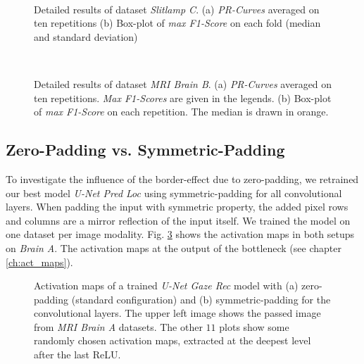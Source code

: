 \begin{figure}[!htbp]
  \centering
  \\[30pt]
  \caption[Detailed results of dataset \textit{Slitlamp C}]{Detailed results of dataset \textit{Slitlamp C}. (a) \textit{PR-Curves} averaged on ten repetitions (b) Box-plot of \textit{max F1-Score} on each fold (median and standard deviation)}
  \label{fig:curves_ds14}  
\end{figure}

\clearpage
\begin{figure}[!htbp]
  \centering
  \\[20pt]
  \caption[Detailed results of dataset \textit{Slit-Lamp Retina C}]{Detailed results of dataset \textit{MRI Brain B}. (a) \textit{PR-Curves} averaged on ten repetitions. \textit{Max F1-Scores} are given in the legends. (b) Box-plot of \textit{max F1-Score} on each repetition. The median is drawn in orange.}
  \label{fig:curves_ds16}  
\end{figure}

\subsection{Zero-Padding vs. Symmetric-Padding} \label{ch:zero_vs_sym_pad}
To investigate the influence of the border-effect due to zero-padding, we retrained our best model \textit{U-Net Pred Loc} using symmetric-padding for all convolutional layers.
When padding the input with symmetric property, the added pixel rows and columns are a mirror reflection of the input itself.
We trained the model on one dataset per image modality.
Fig. \ref{fig:activatiom_maps_sym} shows the activation maps in both setups on \textit{Brain A}.
The activation maps at the output of the bottleneck (see chapter \ref{ch:act_maps}).

\begin{figure}[!htbp]
  \centering
  \hfill
  \caption[Activation maps symmetric padding]{Activation maps of a trained \textit{U-Net Gaze Rec} model with (a) zero-padding (standard configuration) and (b) symmetric-padding for the convolutional layers. The upper left image shows the passed image from \textit{MRI Brain A} datasets. The other $11$ plots show some randomly chosen activation maps, extracted at the deepest level after the last ReLU.}
  \label{fig:activatiom_maps_sym}
\end{figure}

